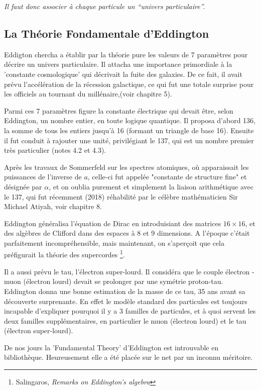 \documentclass[a4paper,12pt]{article}
\begin{document}
\textit{Il faut donc associer à chaque particule un ``univers particulaire''.}

\subsection{La Théorie Fondamentale d'Eddington}

Eddigton chercha a établir par la théorie pure les valeurs de 7 paramètres pour décrire un univers particulaire. Il attacha une importance primordiale à la 'constante cosmologique' qui décrivait la fuite des galaxies. De ce fait, il avait prévu l'accélération de la récession galactique, ce qui fut une totale surprise pour les officiels au tournant du millénaire,(voir chapitre 5). 

Parmi ces 7 paramètres figure la constante électrique qui devait être, selon Eddington, un nombre entier, en toute logique quantique. Il proposa d'abord 136, la somme de tous les entiers jusqu'à 16 (formant un triangle de base 16). Ensuite il fut conduit à rajouter une unité, privilégiant le 137, qui est un nombre premier très particulier (notes 4.2 et 4.3).

Après les travaux de Sommerfeld sur les spectres atomiques, où apparaissait les puissances de l'inverse de $a$, celle-ci fut appelée "constante de structure fine" et désignée par $\alpha$, et on oublia purement et simplement la liaison arithmétique avec le 137, qui fut récemment (2018) réhabilité par le célèbre mathématicien Sir Michael Atiyah, voir chapitre 8.

Eddington généralisa l'équation de Dirac en introduisiant des matrices $16 \times 16$, et des algèbres de Clifford dans des espaces à 8 et 9 dimensions. A l'époque c'était parfaitement incompréhensible, mais maintenant, on s'aperçoit que cela préfigurait la théorie des supercordes \footnote{Salingaros, \textit{Remarks on Eddington's algebra}}.

Il a aussi prévu le tau, l'électron super-lourd. Il considéra que le couple électron - muon (électron lourd) devait se prolonger par une symétrie proton-tau. Eddington donna une bonne estimation de la masse de ce tau, 35 ans avant sa découverte surprenante. En effet le modèle standard des particules est toujours incapable d'expliquer pourquoi il y a 3 familles de particules, et à quoi servent les deux familles supplémentaires, en particulier le muon (électron lourd) et le tau (électron super-lourd).

De nos jours la 'Fundamental Theory' d'Eddington est introuvable en bibliothèque. Heureusement elle a été placée sur le net par un inconnu méritoire.  
\end{document}
